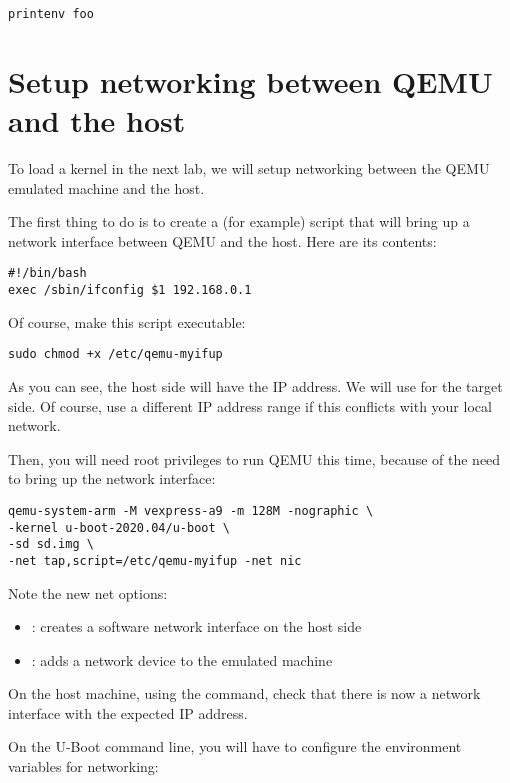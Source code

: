 \begin{verbatim}
printenv foo
\end{verbatim}

\section{Setup networking between QEMU and the host}

To load a kernel in the next lab, we will setup networking between the QEMU emulated
machine and the host.

The first thing to do is to create a  (for example)
script that will bring up a network interface between QEMU and the host. Here are its contents:

\begin{verbatim}
#!/bin/bash
exec /sbin/ifconfig $1 192.168.0.1
\end{verbatim}

Of course, make this script executable:
\begin{verbatim}
sudo chmod +x /etc/qemu-myifup
\end{verbatim}

As you can see, the host side will have the  IP
address. We will use  for the target side.
Of course, use a different IP address range if this conflicts with your
local network.

Then, you will need root privileges to run QEMU this time,
because of the need to bring up the network interface:

\begin{verbatim}
qemu-system-arm -M vexpress-a9 -m 128M -nographic \
-kernel u-boot-2020.04/u-boot \
-sd sd.img \
-net tap,script=/etc/qemu-myifup -net nic
\end{verbatim}

Note the new net options:
\begin{itemize}
\item {}: creates a software network interface on the host side
\item \code{-net nic}: adds a network device to the emulated machine
\end{itemize}

On the host machine, using the \code{ifconfig} command, check that
there is now a  network interface with the expected IP
address.

On the U-Boot command line, you will have to configure the environment
variables for networking:

